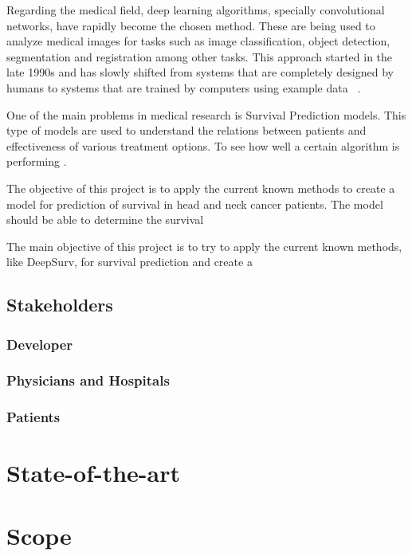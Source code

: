\documentclass[a4paper]{article}
\begin{document}
Regarding the medical field, deep learning algorithms, specially convolutional networks, have 
rapidly become the chosen method. These are being used to analyze medical images for tasks such as
image classification, object detection, segmentation and registration among other tasks. This
approach started in the late 1990s and has slowly shifted from systems that are completely designed
by humans to systems that are trained by computers using example data
~\cite{survey-deep-learning}.

One of the main problems in medical research is Survival Prediction models. This type of models are
used to understand the relations between patients and effectiveness of various treatment options. 
To see how well a certain algorithm is performing 
\cites{DeepSurv}{deep-learning-radiomics-gbm}{ROC-precision-recall}.

The objective of this project is to apply the current known methods to create a model for prediction
of survival in head and neck cancer patients. The model should be able to determine the survival


The main objective of this project is to try to apply the current known methods, like DeepSurv, 
for survival prediction and create a 

\subsection{Stakeholders}

\subsubsection{Developer}
\subsubsection{Physicians and Hospitals}
\subsubsection{Patients}

\section{State-of-the-art}

\section{Scope}

\pagebreak
\printbibliography{}
\end{document}
